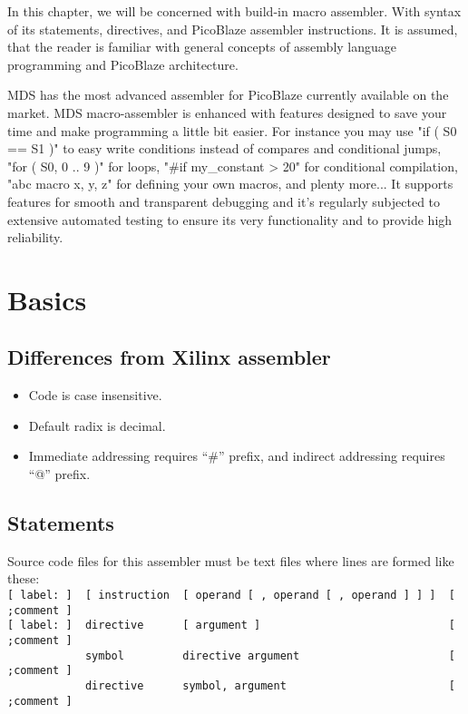In this chapter, we will be concerned with build-in macro assembler. With syntax of its statements, directives, and PicoBlaze assembler instructions. It is assumed, that the reader is familiar with general concepts of assembly language programming and PicoBlaze architecture.

MDS has the most advanced assembler for PicoBlaze currently available on the market. MDS macro-assembler is enhanced with features designed to save your time and make programming a little bit easier. For instance you may use "if ( S0 == S1 )" to easy write conditions instead of compares and conditional jumps, "for ( S0, 0 .. 9 )" for loops, "\#if my\_constant > 20" for conditional compilation, "abc macro x, y, z" for defining your own macros, and plenty more... It supports features for smooth and transparent debugging and it's regularly subjected to extensive automated testing to ensure its very functionality and to provide high reliability.

\section{Basics}
    \subsection{Differences from Xilinx assembler}
        \begin{itemize}
            \item Code is case insensitive.
            \item Default radix is decimal.
            \item Immediate addressing requires ``\#'' prefix, and indirect addressing requires ``@'' prefix.
        \end{itemize}

    \subsection{Statements}
        Source code files for this assembler must be text files where lines are formed like these:\\
        {
            \usecodefont
            \verb'[ label: ]  [ instruction  [ operand [ , operand [ , operand ] ] ]  [ ;comment ]'\\
            \verb'[ label: ]  directive      [ argument ]                             [ ;comment ]'\\
            \verb'            symbol         directive argument                       [ ;comment ]'\\
            \verb'            directive      symbol, argument                         [ ;comment ]'
        }


